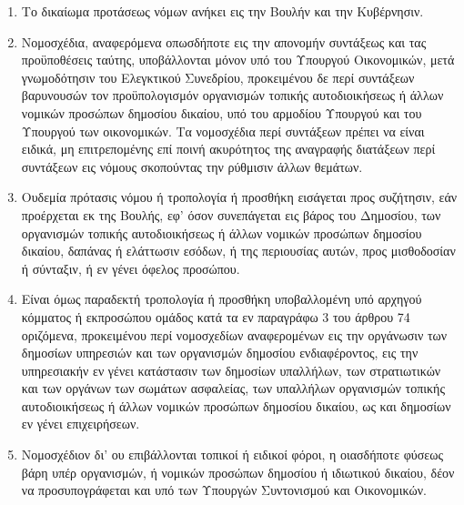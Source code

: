 \documentclass[twoside, a4paper, 10pt]{article}
\begin{document}
\begin{multicols}{2}
\begin{enumerate}
\begin{BigQuote}
\begin{enumerate}
  \item[1.] Το δικαίωμα προτάσεως νόμων ανήκει εις την Βουλήν και την Κυβέρνησιν.
  \item[2.] Νομοσχέδια, αναφερόμενα οπωσδήποτε εις την απονομήν συντάξεως και τας προϋποθέσεις ταύτης, υποβάλλονται μόνον υπό του Υπουργού Οικονομικών, μετά γνωμοδότησιν του Ελεγκτικού Συνεδρίου, προκειμένου δε περί συντάξεων βαρυνουσών τον προϋπολογισμόν οργανισμών τοπικής αυτοδιοικήσεως ή άλλων νομικών προσώπων δημοσίου δικαίου, υπό του αρμοδίου Υπουργού και του Υπουργού των οικονομικών. Τα νομοσχέδια περί συντάξεων πρέπει να είναι ειδικά, μη επιτρεπομένης επί ποινή ακυρότητος της αναγραφής διατάξεων περί συντάξεων εις νόμους σκοπούντας την ρύθμισιν άλλων θεμάτων.
  \item[3.] Ουδεμία πρότασις νόμου ή τροπολογία ή προσθήκη εισάγεται προς συζήτησιν, εάν προέρχεται εκ της Βουλής, εφ' όσον συνεπάγεται εις βάρος του Δημοσίου, των οργανισμών τοπικής αυτοδιοικήσεως ή άλλων νομικών προσώπων δημοσίου δικαίου, δαπάνας ή ελάττωσιν εσόδων, ή της περιουσίας αυτών, προς μισθοδοσίαν ή σύνταξιν, ή εν γένει όφελος προσώπου.
  \item[4.] Είναι όμως παραδεκτή τροπολογία ή προσθήκη υποβαλλομένη υπό αρχηγού κόμματος ή εκπροσώπου ομάδος κατά τα εν παραγράφω 3 του άρθρου 74 οριζόμενα, προκειμένου περί νομοσχεδίων αναφερομένων εις την οργάνωσιν των δημοσίων υπηρεσιών και των οργανισμών δημοσίου ενδιαφέροντος, εις την υπηρεσιακήν εν γένει κατάστασιν των δημοσίων υπαλλήλων, των στρατιωτικών και των οργάνων των σωμάτων ασφαλείας, των υπαλλήλων οργανισμών τοπικής αυτοδιοικήσεως ή άλλων νομικών προσώπων δημοσίου δικαίου, ως και δημοσίων εν γένει επιχειρήσεων.
  \item[5.] Νομοσχέδιον δι' ου επιβάλλονται τοπικοί ή ειδικοί φόροι, η οιασδήποτε φύσεως βάρη υπέρ οργανισμών, ή νομικών προσώπων δημοσίου ή ιδιωτικού δικαίου, δέον να προσυπογράφεται και υπό των Υπουργών Συντονισμού και Οικονομικών.
\end{enumerate}


\end{BigQuote}
\end{enumerate}
\end{multicols}
\end{document}
